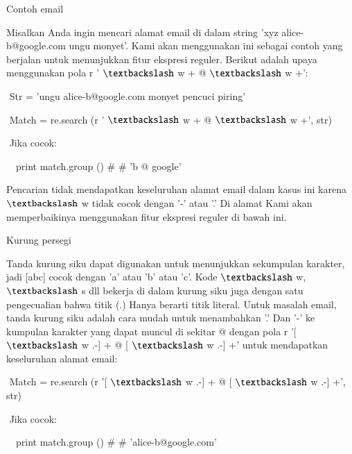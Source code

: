 \documentclass[a4paper,12pt]{report}
\begin{document}
\noindent 
Contoh email \par
\noindent 
\vspace{12pt}
\noindent 
Misalkan Anda ingin mencari alamat email di dalam string 'xyz alice-b@google.com ungu monyet'. Kami akan menggunakan ini sebagai contoh yang berjalan untuk menunjukkan fitur ekspresi reguler. Berikut adalah upaya menggunakan pola r ' $  \textbackslash  $ w + @  $  \textbackslash  $ w +': \par
\noindent 
\vspace{12pt}
\noindent 
 $  $ $  $Str = 'ungu alice-b@google.com monyet pencuci piring' \par
\noindent 
 $  $ $  $Match = re.search (r ' $  \textbackslash  $ w + @  $  \textbackslash  $ w +', str) \par
\noindent 
 $  $ $  $Jika cocok: \par
\noindent 
 $  $ $  $ $  $ $  $print match.group ()  $  \#  $ $  \#  $ 'b @ google' \par
\noindent 
\vspace{12pt}
\noindent 
Pencarian tidak mendapatkan keseluruhan alamat email dalam kasus ini karena  $  \textbackslash  $ w tidak cocok dengan '-' atau '.' Di alamat Kami akan memperbaikinya menggunakan fitur ekspresi reguler di bawah ini. \par
\noindent 
Kurung persegi \par
\noindent 
\vspace{12pt}
\noindent 
Tanda kurung siku dapat digunakan untuk menunjukkan sekumpulan karakter, jadi [abc] cocok dengan 'a' atau 'b' atau 'c'. Kode  $  \textbackslash  $ w,  $  \textbackslash  $ s dll bekerja di dalam kurung siku juga dengan satu pengecualian bahwa titik (.) Hanya berarti titik literal. Untuk masalah email, tanda kurung siku adalah cara mudah untuk menambahkan '.' Dan '-' ke kumpulan karakter yang dapat muncul di sekitar @ dengan pola r '[ $  \textbackslash  $ w .-] + @ [ $  \textbackslash  $ w .-] +' untuk mendapatkan keseluruhan alamat email: \par
\noindent 
\vspace{12pt}
\noindent 
 $  $ $  $Match = re.search (r '[ $  \textbackslash  $ w .-] + @ [ $  \textbackslash  $ w .-] +', str) \par
\noindent 
 $  $ $  $Jika cocok: \par
\noindent 
 $  $ $  $ $  $ $  $print match.group ()  $  \#  $ $  \#  $ 'alice-b@google.com' \par
\noindent 
\vspace{12pt}
\noindent 
\end{document}
